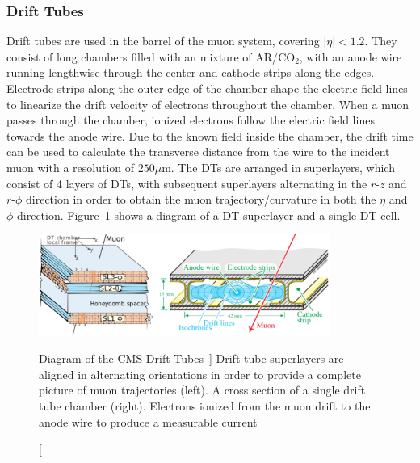 \subsubsection{Drift Tubes} \label{sec:CMS_DT}
Drift tubes are used in the barrel of the muon system, covering $\left|\eta\right| < 1.2$. They consist of long chambers filled with an mixture of AR/$\text{CO}_2$, with an anode wire running lengthwise through the center and cathode strips along the edges. Electrode strips along the outer edge of the chamber shape the electric field lines to linearize the drift velocity of electrons throughout the chamber. When a muon passes through the chamber, ionized electrons follow the electric field lines towards the anode wire. Due to the known field inside the chamber, the drift time can be used to calculate the transverse distance from the wire to the incident muon with a resolution of $250\unit{\mu\m}$. The DTs are arranged in superlayers, which consist of 4 layers of DTs, with subsequent superlayers alternating in the $r$-$z$ and $r$-$\phi$ direction in order to obtain the muon trajectory/curvature in both the $\eta$ and $\phi$ direction. Figure~\ref{fig:DT} shows a diagram of a DT superlayer and a single DT cell.

\begin{figure}[htpb]
	\centering
	\includegraphics[width=0.85\textwidth]{figs/03_experiment/CMS_DT.png}
	\caption
	[Diagram of the CMS Drift Tubes~\cite{CMSDT}]
	{Drift tube superlayers are aligned in alternating orientations in order to provide a complete picture of muon trajectories (left). A cross section of a single drift tube chamber (right). Electrons ionized from the muon drift to the anode wire to produce a measurable current~\cite{CMSDT}}
	\label{fig:DT}
\end{figure}

